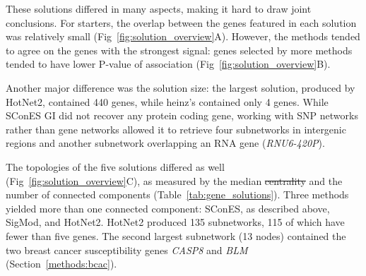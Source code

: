 \documentclass[10pt,letterpaper]{article}
\providecommand{\DIFaddtex}[1]{{\protect\color{blue}\uwave{#1}}} %
\providecommand{\DIFdeltex}[1]{{\protect\color{red}\sout{#1}}}                      %
\providecommand{\DIFaddbegin}{} %
\providecommand{\DIFaddend}{} %
\providecommand{\DIFdelbegin}{} %
\providecommand{\DIFdelend}{} %
\providecommand{\DIFadd}[1]{\texorpdfstring{\DIFaddtex{#1}}{#1}} %
\providecommand{\DIFdel}[1]{\texorpdfstring{\DIFdeltex{#1}}{}} %
\newcommand{\DIFscaledelfig}{0.5}
\newlength{\DIFdelgraphicswidth} %
\newlength{\DIFdelgraphicsheight} %
\newcommand{\DIFaddincludegraphics}[2][]{{\color{blue}\fbox{\DIFOincludegraphics[#1]{#2}}}} %
\newcommand{\DIFdelincludegraphics}[2][]{%
\sbox{\DIFdelgraphicsbox}{\DIFOincludegraphics[#1]{#2}}%
\settoboxwidth{\DIFdelgraphicswidth}{\DIFdelgraphicsbox} %
\settoboxtotalheight{\DIFdelgraphicsheight}{\DIFdelgraphicsbox} %
\scalebox{\DIFscaledelfig}{%
\parbox[b]{\DIFdelgraphicswidth}{\usebox{\DIFdelgraphicsbox}\\[-\baselineskip] \rule{\DIFdelgraphicswidth}{0em}}\llap{\resizebox{\DIFdelgraphicswidth}{\DIFdelgraphicsheight}{%
\setlength{\unitlength}{\DIFdelgraphicswidth}%
\begin{picture}(1,1)%
\thicklines\linethickness{2pt} %
{\color[rgb]{1,0,0}\put(0,0){\framebox(1,1){}}}%
{\color[rgb]{1,0,0}\put(0,0){\line( 1,1){1}}}%
{\color[rgb]{1,0,0}\put(0,1){\line(1,-1){1}}}%
\end{picture}%
}\hspace*{3pt}}} %
} %
\DeclareRobustCommand{\DIFaddbegin}{\DIFOaddbegin \let\includegraphics\DIFaddincludegraphics} %
\DeclareRobustCommand{\DIFaddend}{\DIFOaddend \let\includegraphics\DIFOincludegraphics} %
\DeclareRobustCommand{\DIFdelbegin}{\DIFOdelbegin \let\includegraphics\DIFdelincludegraphics} %
\DeclareRobustCommand{\DIFdelend}{\DIFOaddend \let\includegraphics\DIFOincludegraphics} %
\begin{document}
These solutions differed in many aspects, making it hard to draw joint conclusions. For starters, the overlap between the genes featured in each solution was relatively small (Fig~\ref{fig:solution_overview}A). However, the methods tended to agree on the genes with the strongest signal: genes selected by more methods tended to have lower P-value of association (Fig~\ref{fig:solution_overview}B).

Another major difference was the solution size: the largest solution, produced by HotNet2, contained 440 genes, while heinz's contained only 4 genes. While SConES GI did not recover any protein coding gene, working with SNP networks rather than gene networks allowed it to retrieve four subnetworks in intergenic regions and another subnetwork overlapping an RNA gene (\emph{RNU6-420P}).

The topologies of the five solutions differed as well (Fig~\ref{fig:solution_overview}C), as measured by the median \DIFdelbegin \DIFdel{centrality }\DIFdelend \DIFaddbegin \DIFadd{betweenness }\DIFaddend and the number of connected components (Table~\ref{tab:gene_solutions}). Three methods yielded more than one connected component: SConES, as described above, SigMod, and HotNet2. HotNet2 produced 135 subnetworks, 115 of which have fewer than five genes. The second largest subnetwork (13 nodes) contained the two breast cancer susceptibility genes \emph{CASP8} and \emph{BLM} (Section~\ref{methods:bcac}).
\end{document}
